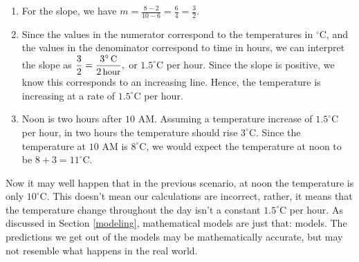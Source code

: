 {
\begin{enumerate}

\item For the slope, we have  $m = \frac{8 - 2}{10 - 6} = \frac{6}{4} = \frac{3}{2}$.  

\item  Since the values in the numerator correspond to the temperatures in $^{\circ}$C, and the values in the denominator correspond to time in hours, we can interpret the slope as $\dfrac{3}{2} = \dfrac{3^{\circ} \, \mbox{\small C}}{2 \, \mbox{\small hour}},$ or $1.5^{\circ}$C per hour.  Since the slope is positive, we know this corresponds to an increasing line.  Hence, the temperature is increasing at a rate of $1.5^{\circ}$C per hour.

\item  Noon is two hours after $10$ AM.  Assuming a temperature increase of $1.5^{\circ}$C per hour, in two hours the temperature should rise $3^{\circ}$C.  Since the temperature at $10$ AM is $8^{\circ}$C, we would expect the temperature at noon to be $8+3=11^{\circ}$C.
\end{enumerate}
}

\medskip

Now it may well happen that in the previous scenario, at noon the temperature is only $10^{\circ}$C.  This doesn't mean our calculations are incorrect, rather, it means that the temperature change throughout the day isn't a constant $1.5^{\circ}$C per hour. As discussed in Section \ref{modeling}, mathematical models are just that:  models.  The predictions we get out of the models may be mathematically accurate, but may not resemble what happens in the real world. 


